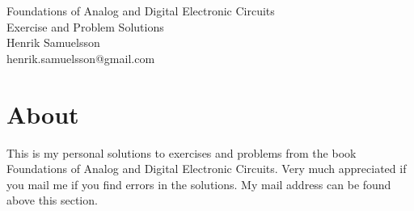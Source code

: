 \documentclass[]{article}
\begin{document}
\begingroup  
	\raggedright
	\LARGE Foundations of Analog and Digital Electronic Circuits\\
	\LARGE Exercise and Problem Solutions\\
	\vspace{3mm} %
	\normalsize Henrik Samuelsson\\
	\normalsize henrik.samuelsson@gmail.com
\endgroup
	
\section*{About}
	This is my personal solutions to exercises and problems from the book Foundations of Analog and Digital Electronic Circuits. Very much appreciated if you mail me if you find errors in the solutions. My mail address can be found above this section.
\end{document}
